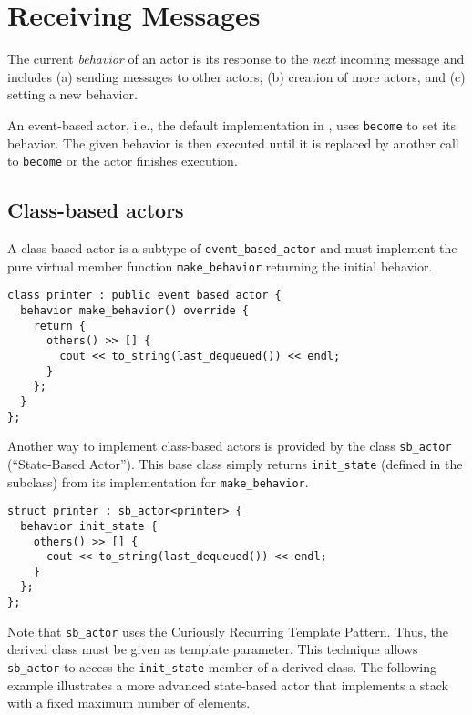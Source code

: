 \section{Receiving Messages}
\label{Sec::Receive}

The current \textit{behavior} of an actor is its response to the \textit{next} incoming message and includes (a) sending messages to other actors, (b) creation of more actors, and (c) setting a new behavior.

An event-based actor, i.e., the default implementation in \lib, uses \lstinline^become^ to set its behavior.
The given behavior is then executed until it is replaced by another call to \lstinline^become^ or the actor finishes execution.

\subsection{Class-based actors}

A class-based actor is a subtype of \lstinline^event_based_actor^ and must implement the pure virtual member function \lstinline^make_behavior^ returning the initial behavior.

\begin{lstlisting}
class printer : public event_based_actor {
  behavior make_behavior() override {
    return {
      others() >> [] {
        cout << to_string(last_dequeued()) << endl;
      }
    };
  }
};
\end{lstlisting}

Another way to implement class-based actors is provided by the class \lstinline^sb_actor^ (``State-Based Actor'').
This base class simply returns \lstinline^init_state^ (defined in the subclass) from its implementation for \lstinline^make_behavior^.

\begin{lstlisting}
struct printer : sb_actor<printer> {
  behavior init_state {
    others() >> [] {
      cout << to_string(last_dequeued()) << endl;
    }
  };
};
\end{lstlisting}

Note that \lstinline^sb_actor^ uses the Curiously Recurring Template Pattern. Thus, the derived class must be given as template parameter.
This technique allows \lstinline^sb_actor^ to access the \lstinline^init_state^ member of a derived class.
The following example illustrates a more advanced state-based actor that implements a stack with a fixed maximum number of elements.

